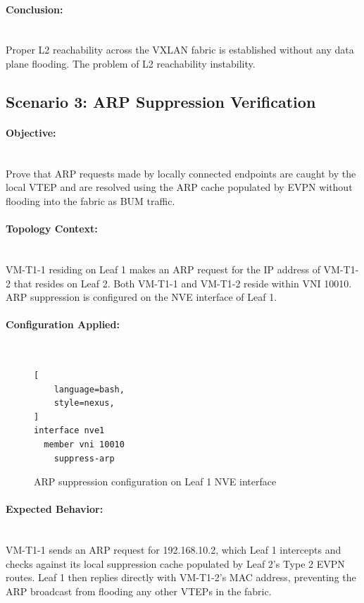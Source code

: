 \paragraph{Conclusion:}~\\
Proper L2 reachability across the VXLAN fabric is established without any data plane flooding. The problem of L2 reachability instability.

\subsection{Scenario 3: ARP Suppression Verification}
\paragraph{Objective:}~\\
Prove that ARP requests made by locally connected endpoints are caught by the local VTEP and are resolved using the ARP cache populated by EVPN without flooding into the fabric as BUM traffic.

\paragraph{Topology Context:}~\\
VM-T1-1 residing on Leaf 1 makes an ARP request for the IP address of VM-T1-2 that resides on Leaf 2. Both VM-T1-1 and VM-T1-2 reside within VNI 10010. ARP suppression is configured on the NVE interface of Leaf 1.

\paragraph{Configuration Applied:}~\\
\begin{figure}[!htbp]
\centering
\begin{lstlisting}[
    language=bash,
    style=nexus,
]
interface nve1
  member vni 10010
    suppress-arp
\end{lstlisting}
\caption{ARP suppression configuration on Leaf 1 NVE interface}
\label{fig:scenario3-arp-suppression}
\end{figure}

\paragraph{Expected Behavior:}~\\
VM-T1-1 sends an ARP request for 192.168.10.2, which Leaf 1 intercepts and checks against its local suppression cache populated by Leaf 2's Type 2 EVPN routes. Leaf 1 then replies directly with VM-T1-2's MAC address, preventing the ARP broadcast from flooding any other VTEPs in the fabric.
